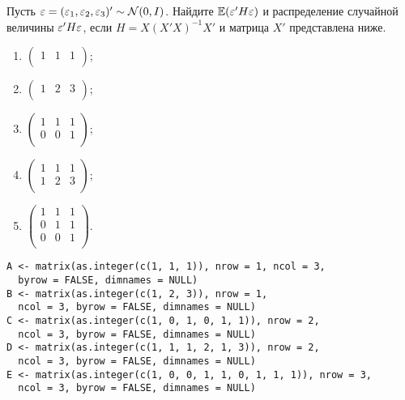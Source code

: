 \begin{problem}
Пусть $\varepsilon = (\varepsilon_1, \varepsilon_2, \varepsilon_3)'\sim \mathcal{N} (0,I)$. Найдите $\mathbb{E}(\varepsilon'H\varepsilon)$ и распределение случайной величины $\varepsilon'H\varepsilon$, если $H = X(X'X)^{-1}X'$ и матрица $X'$ представлена ниже.
\begin{enumerate}
\item $\begin{pmatrix}{}
    1 &   1 &   1 \\ 
  \end{pmatrix}$;

\item $\begin{pmatrix}{}
    1 &   2 &   3 \\ 
  \end{pmatrix}$;

\item $\begin{pmatrix}{}
    1 &   1 &   1 \\ 
    0 &   0 &   1 \\ 
  \end{pmatrix}$;

\item $\begin{pmatrix}{}
    1 &   1 &   1 \\ 
    1 &   2 &   3 \\ 
  \end{pmatrix}$;
\item $\begin{pmatrix}{}
    1 &   1 &   1 \\ 
    0 &   1 &   1 \\ 
    0 &   0 &   1 \\ 
  \end{pmatrix}$.
\end{enumerate}


\begin{sol}
\begin{verbatim}
A <- matrix(as.integer(c(1, 1, 1)), nrow = 1, ncol = 3,
  byrow = FALSE, dimnames = NULL)
B <- matrix(as.integer(c(1, 2, 3)), nrow = 1,
  ncol = 3, byrow = FALSE, dimnames = NULL)
C <- matrix(as.integer(c(1, 0, 1, 0, 1, 1)), nrow = 2,
  ncol = 3, byrow = FALSE, dimnames = NULL)
D <- matrix(as.integer(c(1, 1, 1, 2, 1, 3)), nrow = 2,
  ncol = 3, byrow = FALSE, dimnames = NULL)
E <- matrix(as.integer(c(1, 0, 0, 1, 1, 0, 1, 1, 1)), nrow = 3,
  ncol = 3, byrow = FALSE, dimnames = NULL)
\end{verbatim}


\end{sol}
\end{problem}



